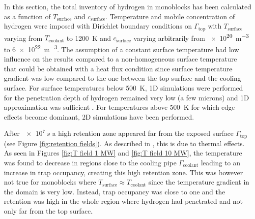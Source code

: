 In this section, the total inventory of hydrogen in monoblocks has been calculated as a function of $T_\mathrm{surface}$ and $c_\mathrm{surface}$.
Temperature and mobile concentration of hydrogen were imposed with Dirichlet boundary conditions on $\Gamma_\mathrm{top}$ with $T_\mathrm{surface}$ varying from $T_\mathrm{coolant}$ to \SI{1200}{K} and $c_\mathrm{surface}$ varying \textcolor{black}{arbitrarily} from \SI{e20}{m^{-3}} to \SI{6e22}{m^{-3}}.
The assumption of a constant surface temperature had low influence on the results compared to a non-homogeneous surface temperature that could be obtained with a heat flux condition since surface temperature gradient was low compared to the one between the top surface and the cooling surface.
For surface temperatures below \SI{500}{K}, 1D simulations were performed for the penetration depth of hydrogen remained very low (a few microns) and 1D approximation was sufficient .
For temperatures above \SI{500}{K} for which edge effects become dominant, 2D simulations have been performed.

After $ \SI{e7}{s}$ a high retention zone appeared far from the exposed surface $\Gamma_\mathrm{top}$ (see Figure \ref{fig:retention fields}).
As described in , this is due to thermal effects.
As seen in Figures \ref{fig:T field 1 MW} and \ref{fig:T field 10 MW}, the temperature was found to decrease in regions close to the cooling pipe $\Gamma_\mathrm{coolant}$ leading to an increase in trap occupancy, creating this high retention zone.
This was however not true for monoblocks where $T_\mathrm{surface} \approx T_\mathrm{coolant}$ since the temperature gradient in the domain is very low.
Instead, trap occupancy was close to one and the retention was high in the whole region where hydrogen had penetrated and not only far from the top surface.

